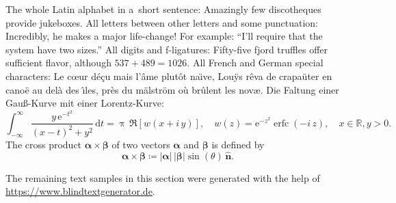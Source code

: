 \documentclass[12pt, a4paper, oneside]{article}
\theoremstyle{Plain}
\theoremstyle{Definition}
\theoremstyle{Remark}
\begin{document}
The whole Latin alphabet in a~short sentence: Amazingly few discotheques provide jukeboxes. All letters between other letters and some punctuation: Incredibly, he makes a major life-change! For example: ``I'll require that the system have two sizes.'' All digits and f-ligatures: Fifty-five fjord truffles offer sufficient flavor, although ${537 + 489 = 1026}$. All French and German special characters: Le c\oe ur d\'e\c cu mais l'\^ame plut\^ot na\"\i ve, Lou\"ys r\^eva de crapa\"uter en cano\"e au del\`a des \^\i les, pr\`es du m\"alstr\"om o\`u br\^ulent les nov\ae. Die Faltung einer Gau\ss-Kurve mit einer Lorentz-Kurve:
\begin{equation}
\int_{-\infty}^\infty \frac{y\,\mathrm{e}^{-t^2}}{(x-t)^2+y^2}\,\mathrm{d} t =
\uppi \, \Re[w(x + i\,y)], \quad w(z) = \mathrm{e}^{-z^2} \operatorname{erfc}(-i\, z), \quad x \in \mathbb{R}, y>0.
\end{equation}
The cross product $\bm{\alpha} \times \bm{\beta}$ of two vectors $\bm{\alpha}$ and $\bm{\beta}$ is defined by
\begin{equation}
	\bm{\alpha} \times \bm{\beta} \coloneq |\bm{\alpha}| \, |\bm{\beta}| \sin (\theta) \, \hat{\bm{n}}.
\end{equation}

The remaining text samples in this section were generated with the help of \url{https://www.blindtextgenerator.de}.
\end{document}
